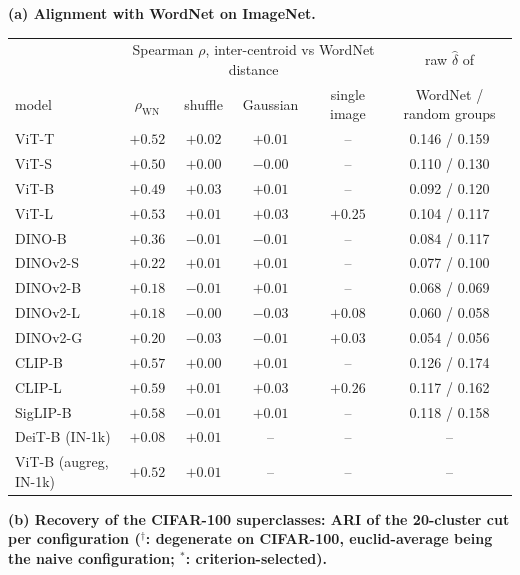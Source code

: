 \begin{table}[H]
\centering
\scriptsize
\setlength{\tabcolsep}{2.6pt}
\begingroup
\noindent\textbf{(a) Alignment with WordNet on ImageNet.}\par\vspace{1.5pt}
\footnotesize
\setlength{\tabcolsep}{4pt}
\begin{tabular}{lcccc|c}
\toprule
 & \multicolumn{4}{c|}{Spearman $\rho$, inter-centroid vs WordNet distance} & raw $\hat\delta$ of \\
model & $\rho_{\text{WN}}$ & shuffle & Gaussian & single image & WordNet / random groups \\
\midrule
ViT-T & $+0.52$ & $+0.02$ & $+0.01$ & -- & 0.146 / 0.159 \\
ViT-S & $+0.50$ & $+0.00$ & $-0.00$ & -- & 0.110 / 0.130 \\
ViT-B & $+0.49$ & $+0.03$ & $+0.01$ & -- & 0.092 / 0.120 \\
ViT-L & $+0.53$ & $+0.01$ & $+0.03$ & $+0.25$ & 0.104 / 0.117 \\
\midrule
DINO-B & $+0.36$ & $-0.01$ & $-0.01$ & -- & 0.084 / 0.117 \\
DINOv2-S & $+0.22$ & $+0.01$ & $+0.01$ & -- & 0.077 / 0.100 \\
DINOv2-B & $+0.18$ & $-0.01$ & $+0.01$ & -- & 0.068 / 0.069 \\
DINOv2-L & $+0.18$ & $-0.00$ & $-0.03$ & $+0.08$ & 0.060 / 0.058 \\
DINOv2-G & $+0.20$ & $-0.03$ & $-0.01$ & $+0.03$ & 0.054 / 0.056 \\
\midrule
CLIP-B & $+0.57$ & $+0.00$ & $+0.01$ & -- & 0.126 / 0.174 \\
CLIP-L & $+0.59$ & $+0.01$ & $+0.03$ & $+0.26$ & 0.117 / 0.162 \\
SigLIP-B & $+0.58$ & $-0.01$ & $+0.01$ & -- & 0.118 / 0.158 \\
\midrule
DeiT-B (IN-1k) & $+0.08$ & $+0.01$ & -- & -- & -- \\
ViT-B (augreg, IN-1k) & $+0.52$ & $+0.01$ & -- & -- & -- \\
\bottomrule
\end{tabular}
\par\vspace{5pt}
\endgroup
\begingroup
\noindent\textbf{(b) Recovery of the CIFAR-100 superclasses: ARI of the 20-cluster cut per configuration ($^{\dagger}$: degenerate on CIFAR-100, euclid-average being the naive configuration; $^{*}$: criterion-selected).}\par\vspace{1.5pt}

\end{table}
